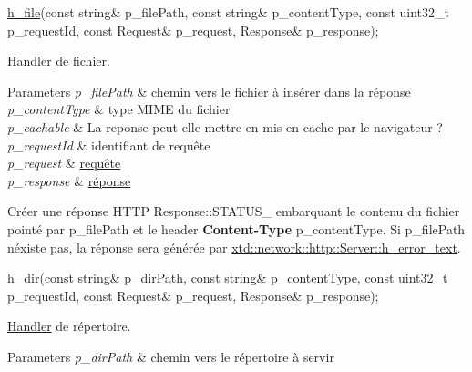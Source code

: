\begin{DoxyItemize}
\begin{DoxyCode}
\hyperlink{classxtd_1_1network_1_1http_1_1Server_ab3525557fb71fe7ffec9bf68b61db107}{h\_file}(\textcolor{keyword}{const} \textcolor{keywordtype}{string}& p\_filePath, \textcolor{keyword}{const} \textcolor{keywordtype}{string}& p\_contentType, \textcolor{keyword}{const} uint32\_t p\_requestId, \textcolor{keyword}{const} 
      Request& p\_request, Response& p\_response); 
\end{DoxyCode}
 \hyperlink{classxtd_1_1network_1_1http_1_1Server_1_1Handler}{Handler} de fichier. 
\begin{DoxyParams}{Parameters}
{\em p\+\_\+file\+Path} & chemin vers le fichier à insérer dans la réponse \\
\hline
{\em p\+\_\+content\+Type} & type M\+I\+ME du fichier \\
\hline
{\em p\+\_\+cachable} & La reponse peut elle mettre en mis en cache par le navigateur ? \\
\hline
{\em p\+\_\+request\+Id} & identifiant de requête \\
\hline
{\em p\+\_\+request} & \hyperlink{classxtd_1_1network_1_1http_1_1Request}{requête} \\
\hline
{\em p\+\_\+response} & \hyperlink{classxtd_1_1network_1_1http_1_1Response}{réponse}\\
\hline
\end{DoxyParams}
Créer une réponse H\+T\+TP Response\+::\+S\+T\+A\+T\+U\+S\+\_ embarquant le contenu du fichier pointé par p\+\_\+file\+Path et le header {\bfseries Content-\/\+Type} p\+\_\+content\+Type. Si p\+\_\+file\+Path n\textquotesingle{}éxiste pas, la réponse sera générée par \hyperlink{classxtd_1_1network_1_1http_1_1Server_ad57a524ff44201af997e2d3557557623}{xtd\+::network\+::http\+::\+Server\+::h\+\_\+error\+\_\+text}.
\item 
\begin{DoxyCode}
\hyperlink{classxtd_1_1network_1_1http_1_1Server_a7b7fb002ef005e7dd7b502c95587f4f2}{h\_dir}(\textcolor{keyword}{const} \textcolor{keywordtype}{string}& p\_dirPath, \textcolor{keyword}{const} \textcolor{keywordtype}{string}& p\_contentType, \textcolor{keyword}{const} uint32\_t p\_requestId, \textcolor{keyword}{const} Request&
       p\_request, Response& p\_response); 
\end{DoxyCode}
 \hyperlink{classxtd_1_1network_1_1http_1_1Server_1_1Handler}{Handler} de répertoire. 
\begin{DoxyParams}{Parameters}
{\em p\+\_\+dir\+Path} & chemin vers le répertoire à servir \\

\end{DoxyParams}
\end{DoxyItemize}

